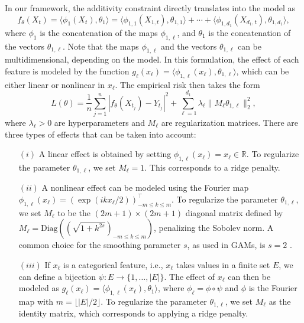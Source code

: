 In our framework, the additivity constraint directly translates into the model as
\[
f_{\theta}(X_t) =  \langle \phi_{1}(X_{t}), \theta_{1}\rangle = \langle \phi_{1,1}(X_{1,t}), \theta_{1,1}\rangle + \cdots + \langle \phi_{1,d_1}(X_{d_1,t}), \theta_{1,d_1}\rangle,
\]
where $\phi_1$ is the concatenation of the maps $\phi_{1,\ell}$, and $\theta_1$ is the concatenation of the vectors  $\theta_{1,\ell}$. 
Note that the maps $\phi_{1,\ell}$ and the vectors $\theta_{1, \ell}$ can be multidimensional, depending on the model.
In this formulation, the effect of each feature is modeled by the function $g_\ell(x_\ell) = \langle \phi_{1,\ell}(x_\ell), \theta_{1,\ell}\rangle$, which can be either linear or nonlinear in $x_\ell$.
The empirical risk then takes the form
\begin{equation}
    L(\theta) = \frac{1}{n} \sum_{j=1}^n |f_\theta(X_{t_j}) - Y_{t_j}|^2 + \sum_{\ell=1}^{d_1}\lambda_\ell\|M_\ell\theta_{1,\ell}\|_2^2, \label{eq:weaklGAM}
\end{equation}
where $\lambda_\ell >0$ are hyperparameters and $M_\ell$ are regularization matrices.
There are three types of effects that can be taken into account:
\begin{itemize}
    \item[$(i)$] A linear effect is obtained by setting $\phi_{1,\ell}(x_\ell) = x_\ell \in \mathbb R$. 
    To regularize the parameter $\theta_{1, \ell}$, we set $M_\ell = 1$. This corresponds to a ridge penalty.
    \item[$(ii)$] A nonlinear effect can be modeled using the Fourier map $\phi_{1,\ell}(x_\ell) = (\exp(i  k x_\ell  / 2))_{-m\leq k \leq m}^\top$. 
    To regularize the parameter $\theta_{1, \ell}$, we set $M_\ell$ to be the $(2m+1)\times (2m+1)$ diagonal matrix defined by $M_\ell =\mathrm{Diag}((\sqrt{1+k^{2s}})_{-m\leq k\leq m})$, penalizing the Sobolev norm. 
    A common choice for the smoothing parameter $s$, as used in GAMs, is $s = 2$ \citep[see, e.g.,][]{wood2017generalizedbook}.
    \item[$(iii)$] If $x_\ell$ is a categorical feature, i.e., $x_\ell$ takes values in a finite set $E$, we can define a bijection $\psi: E \to \{1, \hdots, |E|\}$. The effect of $x_\ell$ can then be modeled as $g_\ell(x_\ell) = \langle \phi_{1,\ell}(x_\ell), \theta_1 \rangle$, where $\phi_\ell = \phi \circ \psi$ and $\phi$ is the Fourier map with $m = \lfloor |E|/2 \rfloor$. To regularize the parameter $\theta_{1, \ell}$, we set $M_\ell$ as the identity matrix, which corresponds to applying a ridge penalty.
\end{itemize}

